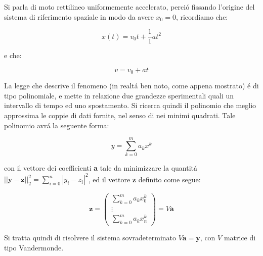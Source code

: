 \begin{center}
\footnotesize\noindent{}\end{center}

\noindent Si parla di moto rettilineo uniformemente accelerato, perci\'o fissando l'origine del sistema di riferimento spaziale in modo da avere \(x_0 = 0\), ricordiamo che:

\[
  x(t) = v_0t +  \frac{1}{1}at^2
\]

\noindent e che:

\[
  v = v_0 + at 
\]

\noindent La legge che descrive il fenomeno (in realt\'a ben noto, come appena mostrato) \'e di tipo polinomiale, e mette in relazione due grandezze sperimentali quali un intervallo di tempo ed uno spostamento. Si ricerca quindi il polinomio che meglio approssima le coppie di dati fornite, nel senso di nei minimi quadrati. Tale polinomio avr\'a la seguente forma:

\[
  y = \sum^m_{k=0}a_kx^k
\]

\noindent con il vettore dei coefficienti \textbf{a} tale da minimizzare la quantit\'a \(||\textbf{y}-\textbf{z}||^2_2 = \sum^n_{i=0}|y_i-z_i|^2\), ed il vettore \textbf{z} definito come segue:

\[
  \textbf{z} = \begin{pmatrix} \sum_{k=0}^m a_kx_0^k \\ \vdots \\  \sum_{k=0}^m a_kx_n^k \end{pmatrix} = V \textbf{a}
\]

\noindent Si tratta quindi di risolvere il sistema sovradeterminato \(V \textbf{a} = \textbf{y} \), con \(V\) matrice di tipo Vandermonde.

